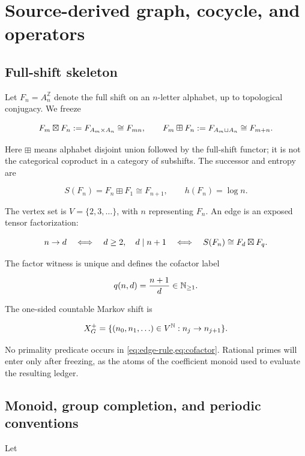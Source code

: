 \section{Source-derived graph, cocycle, and operators}
\label{sec:source}

\subsection{Full-shift skeleton}

Let \(F_n=A_n^{\mathbb Z}\) denote the full shift on an \(n\)-letter
alphabet, up to topological conjugacy.  We freeze

\[
 F_m\mathbin{\boxtimes} F_n:=F_{A_m\times A_n}\cong F_{mn},
 \qquad
 F_m\boxplus F_n:=F_{A_m\sqcup A_n}\cong F_{m+n}.
\]

Here \(\boxplus\) means alphabet disjoint union followed by the full-shift
functor; it is not the categorical coproduct in a category of subshifts.
The successor and entropy are

\[
 S(F_n)=F_n\boxplus F_1\cong F_{n+1},
 \qquad h(F_n)=\log n.
\]

The vertex set is \(V=\{2,3,\ldots\}\), with \(n\) representing \(F_n\).
An edge is an exposed tensor factorization:

\begin{equation}
 n\to d
 \quad\Longleftrightarrow\quad
 d\ge2,\quad d\mid n+1
 \quad\Longleftrightarrow\quad
 S(F_n)\cong F_d\mathbin{\boxtimes} F_q.
\label{eq:edge-rule}
\end{equation}

The factor witness is unique and defines the cofactor label

\begin{equation}
 q(n,d)=\frac{n+1}{d}\in\mathbb N_{\ge1}.
\label{eq:cofactor}
\end{equation}

The one-sided countable Markov shift is

\[
 X_G^+=\{(n_0,n_1,\ldots)\in V^{\mathbb N}:n_j\to n_{j+1}\}.
\]

No primality predicate occurs in \cref{eq:edge-rule,eq:cofactor}.  Rational
primes will enter only after freezing, as the atoms of the coefficient
monoid used to evaluate the resulting ledger.

\subsection{Monoid, group completion, and periodic conventions}

Let


